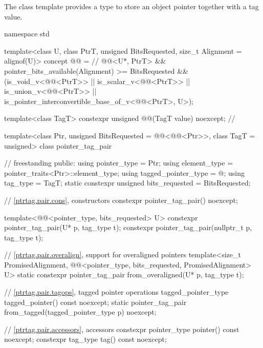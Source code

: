 \pnum
The class template  provides a type to store an
object pointer together with a tag value.

%
\begin{codeblock}
namespace std {
  template<class U, class PtrT, unsigned BitsRequested, size_t Alignment = alignof(U)>
    concept @@ =                        // \expos
      @@<U*, PtrT> &&
      pointer_bits_available(Alignment) >= BitsRequested &&
      (is_void_v<@@<PtrT>> ||
       is_scalar_v<@@<PtrT>> ||
       is_union_v<@@<PtrT>> ||
       is_pointer_interconvertible_base_of_v<@@<PtrT>, U>);

  template<class TagT>
    constexpr unsigned @@(TagT value) noexcept;      // \expos

  template<class Ptr, unsigned BitsRequested = @@<@@<Ptr>>,
           class TagT = unsigned>
  class pointer_tag_pair {                                      // freestanding
  public:
    using pointer_type        = Ptr;
    using element_type        = pointer_traits<Ptr>::element_type;
    using tagged_pointer_type = @\seebelow@;
    using tag_type            = TagT;
    static constexpr unsigned bits_requested = BitsRequested;

    // \ref{ptrtag.pair.cons}, constructors
    constexpr pointer_tag_pair() noexcept;

    template<@@<pointer_type, bits_requested> U>
      constexpr pointer_tag_pair(U* p, tag_type t);
    constexpr pointer_tag_pair(nullptr_t p, tag_type t);

    // \ref{ptrtag.pair.overalign}, support for overaligned pointers
    template<size_t PromisedAlignment,
             @@<pointer_type, bits_requested, PromisedAlignment> U>
      static constexpr pointer_tag_pair from_overaligned(U* p, tag_type t);

    // \ref{ptrtag.pair.tagops}, tagged pointer operations
    tagged_pointer_type tagged_pointer() const noexcept;
    static pointer_tag_pair from_tagged(tagged_pointer_type p) noexcept;

    // \ref{ptrtag.pair.accessors}, accessors
    constexpr pointer_type pointer() const noexcept;
    constexpr tag_type tag() const noexcept;

}}
\end{codeblock}
